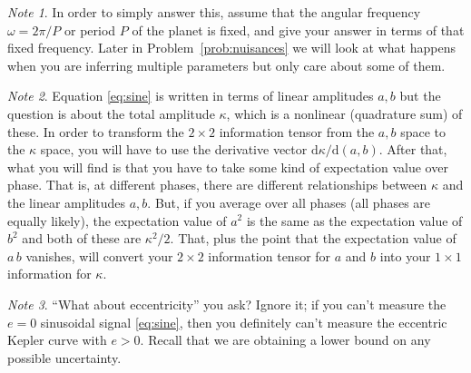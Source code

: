 \documentclass{article}
\theoremstyle{definition}
\newcommand{\problemname}{Problem}
\newcommand{\probref}[1]{\problemname~\ref{#1}}
\theoremstyle{remark}
\newcommand{\notename}{Note}
\newtheorem{note}{\notename}[problem]
\newcommand{\dd}{\mathrm{d}}
\begin{document}
\begin{note}
In order to simply answer this, assume that the angular frequency $\omega = 2\pi/P$ or period $P$ of the planet is fixed, and give your answer in terms of that fixed frequency.
Later in \probref{prob:nuisances} we will look at what happens when you are inferring multiple parameters but only care about some of them.
\end{note}

\begin{note}
Equation \eqref{eq:sine} is written in terms of linear amplitudes $a, b$ but the question is about the total amplitude $\kappa$, which is a nonlinear (quadrature sum) of these.
In order to transform the $2\times 2$ information tensor from the $a, b$ space to the $\kappa$ space, you will have to use the derivative vector $\dd\kappa/\dd(a,b)$.
After that, what you will find is that you have to take some kind of expectation value over phase.
That is, at different phases, there are different relationships between $\kappa$ and the linear amplitudes $a, b$.
But, if you average over all phases (all phases are equally likely), the expectation value of $a^2$ is the same as the expectation value of $b^2$ and both of these are $\kappa^2/2$.
That, plus the point that the expectation value of $a\,b$ vanishes, will convert your $2\times 2$ information tensor for $a$ and $b$ into your $1\times 1$ information for $\kappa$.
\end{note}

\begin{note}
``What about eccentricity'' you ask?
Ignore it; if you can't measure the $e=0$ sinusoidal signal \eqref{eq:sine}, then you definitely can't measure the eccentric Kepler curve with $e>0$.
Recall that we are obtaining a lower bound on any possible uncertainty.
\end{note}
\end{document}
